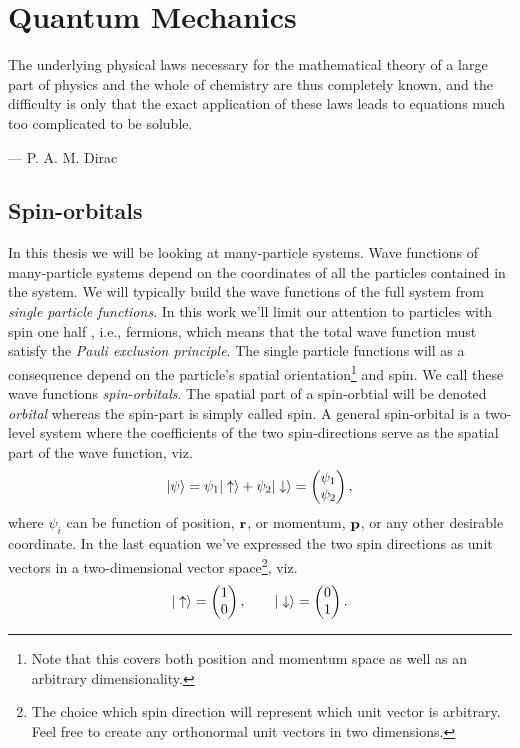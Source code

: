 \chapter{Quantum Mechanics}
    \epigraph{The underlying physical laws necessary for the mathematical
    theory of a large part of physics and the whole of chemistry are thus
    completely known, and the difficulty is only that the exact application of
    these laws leads to equations much too complicated to be soluble.}
    {--- P. A. M. Dirac}

    \section{Spin-orbitals}
        In this thesis we will be looking at many-particle systems. Wave
        functions of many-particle systems depend on the coordinates of all the
        particles contained in the system. We will typically build the wave
        functions of the full system from \emph{single particle functions}. In
        this work we'll limit our attention to particles with spin one half ,
        i.e., fermions, which means that the total wave function must satisfy
        the \emph{Pauli exclusion principle}. The single particle functions
        will as a consequence depend on the particle's spatial
        orientation\footnote{Note that this covers both position and momentum
        space as well as an arbitrary dimensionality.} and spin. We call
        these wave functions \emph{spin-orbitals}. The spatial part of a
        spin-orbtial will be denoted \emph{orbital} whereas the spin-part is
        simply called spin. A general spin-orbital is a two-level system where
        the coefficients of the two spin-directions serve as the spatial part of
        the wave function, viz.
        \begin{align}
            | \psi \rangle = \psi_1| \uparrow \rangle + \psi_2| \downarrow \rangle
            =
            \begin{pmatrix}
                \psi_1 \\
                \psi_2
            \end{pmatrix},
        \end{align}
        where $\psi_i$ can be function of position, $\mathbf{r}$, or momentum,
        $\mathbf{p}$, or any other desirable coordinate.  In the last equation we've
        expressed the two spin directions as unit vectors in a two-dimensional
        vector space\footnote{The choice which spin direction will represent
        which unit vector is arbitrary. Feel free to create any orthonormal unit
        vectors in two dimensions.}, viz.
        \begin{align}
            | \uparrow \rangle
            =
            \begin{pmatrix}
                1 \\
                0
            \end{pmatrix},
            \qquad
            | \downarrow \rangle
            =
            \begin{pmatrix}
                0 \\
                1
            \end{pmatrix}.
        \end{align}


